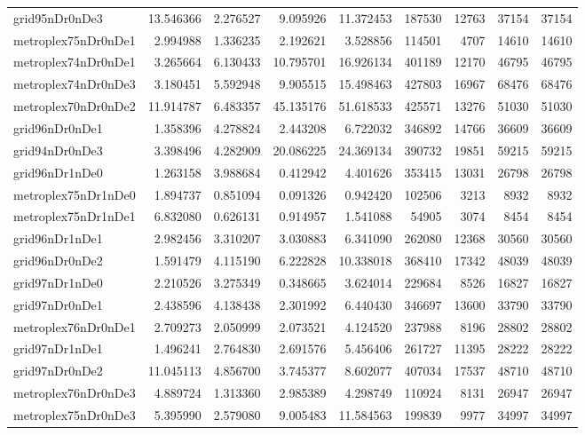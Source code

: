 \begin{longtable}{|l|r|r|r|r|r|r|r|r|}
grid95nDr0nDe3 & 13.546366 & 2.276527 & 9.095926 & 11.372453 & 187530 & 12763 & 37154 & 37154 \\
metroplex75nDr0nDe1 & 2.994988 & 1.336235 & 2.192621 & 3.528856 & 114501 & 4707 & 14610 & 14610 \\
metroplex74nDr0nDe1 & 3.265664 & 6.130433 & 10.795701 & 16.926134 & 401189 & 12170 & 46795 & 46795 \\
metroplex74nDr0nDe3 & 3.180451 & 5.592948 & 9.905515 & 15.498463 & 427803 & 16967 & 68476 & 68476 \\
metroplex70nDr0nDe2 & 11.914787 & 6.483357 & 45.135176 & 51.618533 & 425571 & 13276 & 51030 & 51030 \\
grid96nDr0nDe1 & 1.358396 & 4.278824 & 2.443208 & 6.722032 & 346892 & 14766 & 36609 & 36609 \\
grid94nDr0nDe3 & 3.398496 & 4.282909 & 20.086225 & 24.369134 & 390732 & 19851 & 59215 & 59215 \\
grid96nDr1nDe0 & 1.263158 & 3.988684 & 0.412942 & 4.401626 & 353415 & 13031 & 26798 & 26798 \\
metroplex75nDr1nDe0 & 1.894737 & 0.851094 & 0.091326 & 0.942420 & 102506 & 3213 & 8932 & 8932 \\
metroplex75nDr1nDe1 & 6.832080 & 0.626131 & 0.914957 & 1.541088 & 54905 & 3074 & 8454 & 8454 \\
grid96nDr1nDe1 & 2.982456 & 3.310207 & 3.030883 & 6.341090 & 262080 & 12368 & 30560 & 30560 \\
grid96nDr0nDe2 & 1.591479 & 4.115190 & 6.222828 & 10.338018 & 368410 & 17342 & 48039 & 48039 \\
grid97nDr1nDe0 & 2.210526 & 3.275349 & 0.348665 & 3.624014 & 229684 & 8526 & 16827 & 16827 \\
grid97nDr0nDe1 & 2.438596 & 4.138438 & 2.301992 & 6.440430 & 346697 & 13600 & 33790 & 33790 \\
metroplex76nDr0nDe1 & 2.709273 & 2.050999 & 2.073521 & 4.124520 & 237988 & 8196 & 28802 & 28802 \\
grid97nDr1nDe1 & 1.496241 & 2.764830 & 2.691576 & 5.456406 & 261727 & 11395 & 28222 & 28222 \\
grid97nDr0nDe2 & 11.045113 & 4.856700 & 3.745377 & 8.602077 & 407034 & 17537 & 48710 & 48710 \\
metroplex76nDr0nDe3 & 4.889724 & 1.313360 & 2.985389 & 4.298749 & 110924 & 8131 & 26947 & 26947 \\
metroplex75nDr0nDe3 & 5.395990 & 2.579080 & 9.005483 & 11.584563 & 199839 & 9977 & 34997 & 34997 \\

\end{longtable}
